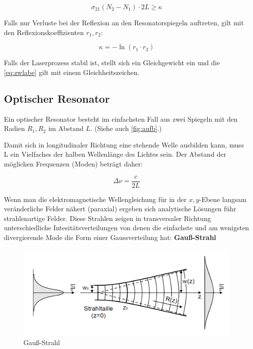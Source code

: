 \documentclass[slug=GL, room=HZDR\ Dresden/Rossendorf\,\ Geb.\ 620/123, supervisor=Tim\ Ziegler]{../../Lab_Report_LaTeX/lab_report}
\begin{document}
\begin{equation}
  \label{eq:zwlabe}
  \tag{zweite Laserbedingung}
  \sigma_{21}(N_2-N_1)\cdot 2L \geq \kappa
\end{equation}

Falls nur Verluste bei der Reflexion an den Resonatorspiegeln
auftreten, gilt mit den Reflexionskoeffizienten \(r_1,r_2\):

\begin{equation}
  \label{eq:kappa}
  \kappa = - \ln(r_1\cdot r_2)
\end{equation}

Falls der Laserprozess stabil ist, stellt sich ein Gleichgewicht ein
und die \ref{eq:zwlabe} gilt mit einem Gleichheitszeichen.

\subsection{Optischer Resonator}
\label{sec:reso}

Ein optischer Resonator besteht im einfachsten Fall aus zwei Spiegeln
mit den Radien \(R_1,R_2\) im Abstand \(L\). (Siehe auch
\ref{fig:aufb}.)

Damit sich in longitudinaler Richtung eine stehende Welle ausbilden
kann, muss L ein Vielfaches der halben Wellenl\"ange des Lichtes sein.
Der Abstand der m\"oglichen Frequenzen (Moden) betr\"agt daher:

\begin{equation}
  \label{eq:longmodes}
  \Delta\nu = \frac{c}{2L}
\end{equation}

Wenn man die elektromagnetische Wellengleichung f\"ur in der
\(x,y\)-Ebene langsam ver\"anderliche Felder n\"ahert (paraxial)
ergeben sich analytische L\"osungen f\"uhr strahlenartige Felder.
Diese Strahlen zeigen in transversaler Richtung unterschiedliche
Intesit\"atsverteilungen von denen die einfachste und am wenigsten
divergierende Mode die Form einer Gaussverteilung hat:
\textbf{Gau\ss{}-Strahl}

\begin{figure}[H]\centering
  \includegraphics[width=.5\columnwidth]{gauss-strahl.png}
  \caption[Gauss]{Gau\ss{}-Strahl }
  \label{fig:gauss}
\end{figure}
\end{document}
